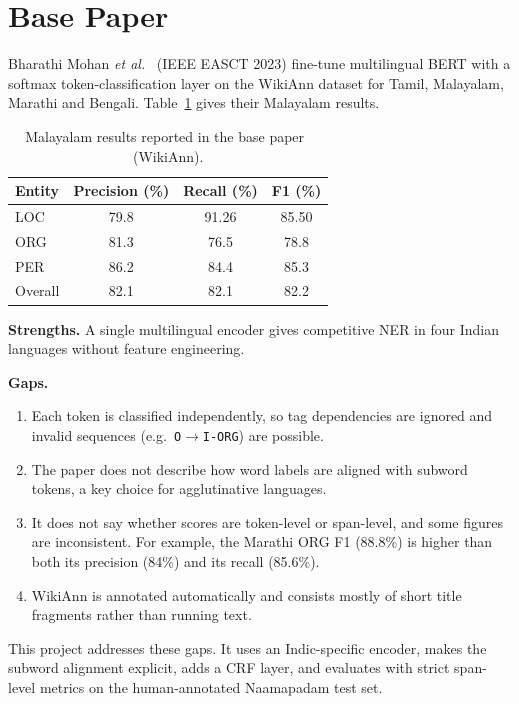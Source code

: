 \section{Base Paper}

Bharathi Mohan \emph{et al.}~\cite{mohan2023finetuned} (IEEE EASCT 2023)
fine-tune multilingual BERT with a softmax token-classification layer on
the WikiAnn dataset for Tamil, Malayalam, Marathi and Bengali.
Table~\ref{tab:base} gives their Malayalam results.

\begin{table}[H]
\centering
\caption{Malayalam results reported in the base paper~\cite{mohan2023finetuned} (WikiAnn).}
\label{tab:base}
\begin{tabular}{lccc}
\toprule
Entity & Precision (\%) & Recall (\%) & F1 (\%) \\
\midrule
LOC     & 79.8 & 91.26 & 85.50 \\
ORG     & 81.3 & 76.5  & 78.8  \\
PER     & 86.2 & 84.4  & 85.3  \\
Overall & 82.1 & 82.1  & 82.2  \\
\bottomrule
\end{tabular}
\end{table}

\textbf{Strengths.} A single multilingual encoder gives competitive NER in
four Indian languages without feature engineering.

\textbf{Gaps.}
\begin{enumerate}
  \item Each token is classified independently, so tag dependencies are
  ignored and invalid sequences (e.g.\ \texttt{O}$\rightarrow$\texttt{I-ORG})
  are possible.
  \item The paper does not describe how word labels are aligned with subword
  tokens, a key choice for agglutinative languages.
  \item It does not say whether scores are token-level or span-level, and
  some figures are inconsistent. For example, the Marathi ORG F1 (88.8\%)
  is higher than both its precision (84\%) and its recall (85.6\%).
  \item WikiAnn is annotated automatically and consists mostly of short
  title fragments rather than running text.
\end{enumerate}

This project addresses these gaps. It uses an Indic-specific encoder, makes
the subword alignment explicit, adds a CRF layer, and evaluates with strict
span-level metrics on the human-annotated Naamapadam test set.
